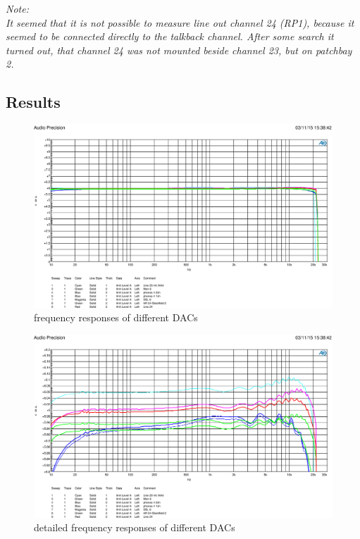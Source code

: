 \documentclass[11pt]{report}
\begin{document}
\begin{leftbar}
\textit{Note:\\
It seemed that it is not possible to measure line out channel 24 (RP1), because it seemed to be connected directly to the talkback channel. After some search it turned out, that channel 24 was not mounted beside channel 23, but on patchbay 2.}
\end{leftbar}
	\subsection{Results}

\begin{figure}[htbp]
\begin{center}
\includegraphics[width=14cm,keepaspectratio=true]{DAWandlerVergleich10dB}
\caption{frequency responses of different DACs}
\label{Abb.:1}
\end{center}
\end{figure}

\begin{figure}[htbp]
\begin{center}
\includegraphics[width=14cm,keepaspectratio=true]{DaWandlerVergleich}
\caption{detailed frequency responses of different DACs}
\label{Abb.:1}
\end{center}
\end{figure}
\end{document}
